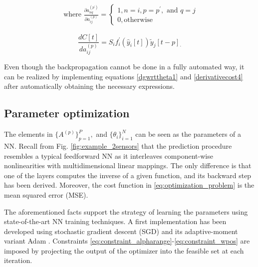 \begin{equation} \label{dCwrtthetaa2}
\begin{array}{c}
\text { where } 
\frac{\partial a_{n q}^{(p^\prime)}}{\partial a_{i j}^{(p)}}=\left\{\begin{array}{l}
1, n=i, p = p^\prime, \text { and } q=j \\
0, \text {otherwise}
\end{array}\right.
\end{array}
\end{equation}


\begin{equation} \label{dCwrtthetaa4}
\frac{d C[t]}{d a_{i j}^{(p)}}=S_i f_{i}^{\prime}\left(\hat{y}_{i}[t]\right) \tilde{y}_{j}[t-p]_\cdot 
\end{equation}

Even though the backpropagation cannot be done in a fully automated way, it can be realized by implementing equations \eqref{dgwrttheta1} and \eqref{derivativecost4} after automatically obtaining the necessary expressions.

\subsection{Parameter optimization}

The elements in $\{A^{(p)}\}_{p=1}^P,$ and $\{\theta_i\}_{i=1}^{N}$ can be seen as the parameters of a NN. Recall from Fig. \ref{fig:example_2sensors} that the prediction procedure resembles a typical feedforward NN as it interleaves component-wise nonlinearities with multidimensional linear mappings. The only difference is that one of the layers computes the inverse of a given function, and its backward step has been derived. Moreover, the cost function in \eqref{eq:optimization_problem} is the mean squared error (MSE).

The aforementioned facts support the strategy of learning the parameters using state-of-the-art NN training techniques. A first implementation has been developed using stochastic gradient descent (SGD) and its adaptive-moment variant Adam \cite{kingma2014adam}. Constraints \eqref{eq:constraint_alpharange}-\eqref{eq:constraint_wpos} are imposed by projecting the output of the optimizer into the feasible set at each iteration.

